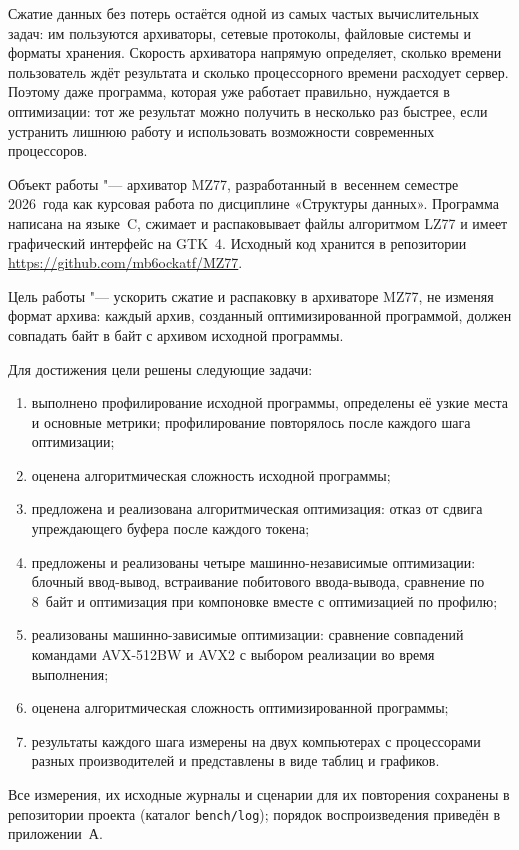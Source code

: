 
Сжатие данных без потерь остаётся одной из самых частых вычислительных
задач: им пользуются архиваторы, сетевые протоколы, файловые системы и
форматы хранения. Скорость архиватора напрямую определяет, сколько
времени пользователь ждёт результата и сколько процессорного времени
расходует сервер. Поэтому даже программа, которая уже работает правильно,
нуждается в оптимизации: тот же результат можно получить в несколько раз
быстрее, если устранить лишнюю работу и использовать возможности
современных процессоров.

Объект работы "--- архиватор MZ77, разработанный в~весеннем семестре
2026~года как курсовая работа по дисциплине «Структуры данных». Программа
написана на языке~C, сжимает и распаковывает файлы алгоритмом
LZ77 и имеет графический интерфейс на GTK~4.
Исходный код хранится в репозитории
\url{https://github.com/mb6ockatf/MZ77}.

Цель работы "--- ускорить сжатие и распаковку в архиваторе MZ77, не изменяя
формат архива: каждый архив, созданный оптимизированной программой, должен
совпадать байт в байт с архивом исходной программы.

Для достижения цели решены следующие задачи:
\begin{enumerate}
\item выполнено профилирование исходной программы, определены её узкие
места и основные метрики; профилирование повторялось после каждого шага
оптимизации;
\item оценена алгоритмическая сложность исходной программы;
\item предложена и реализована алгоритмическая оптимизация: отказ от сдвига
упреждающего буфера после каждого токена;
\item предложены и реализованы четыре машинно-независимые оптимизации:
блочный ввод-вывод, встраивание побитового ввода-вывода, сравнение по
8~байт и оптимизация при компоновке вместе с оптимизацией по профилю;
\item реализованы машинно-зависимые оптимизации: сравнение совпадений
командами AVX-512BW и AVX2 с выбором реализации во время выполнения;
\item оценена алгоритмическая сложность оптимизированной программы;
\item результаты каждого шага измерены на двух компьютерах с процессорами
разных производителей и представлены в виде таблиц и графиков.
\end{enumerate}

Все измерения, их исходные журналы и сценарии для их повторения сохранены в
репозитории проекта (каталог \texttt{bench/log}); порядок воспроизведения
приведён в приложении~А.
